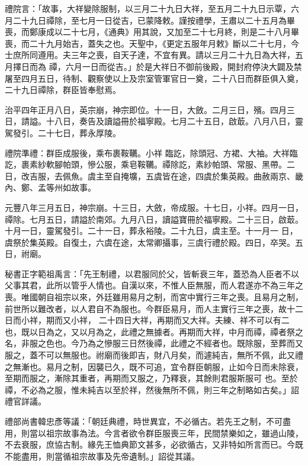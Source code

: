 \begin{pinyinscope}
 禮院言：「故事，大祥變除服制，以三月二十九日大祥，至五月二十九日示覃，六月二十九日禫除，至七月一日從吉，已蒙降敕。謹按禮學，王肅以二十五月為畢喪，而鄭康成以二十七月，《通典》用其說，又加至二十七月終，則是二十八月畢喪，而二十九月始吉，蓋失之也。天聖中，《更定五服年月敕》斷以二十七月，今士庶所同遵用。夫三年之喪，自天子達，不宜有異。請以三月二十九日為大祥，五月擇日而為
 禫，六月一日而從吉。」於是大祥日不御前後殿，開封府停決大闢及禁屠至四月五日，待制、觀察使以上及宗室管軍官日一奠，二十八日而群臣俱入奠，二十九日禫除，群臣皆奉慰焉。



 治平四年正月八日，英宗崩，神宗即位。十一日，大斂。二月三日，殯。四月三日，請謚。十八日，奏告及讀謚冊於福寧殿。七月二十五日，啟菆。八月八日，靈駕發引。二十七日，葬永厚陵。



 禮院準禮：群臣成服後，乘布裹鞍韉。小祥
 臨訖，除頭冠、方裙、大袖。大祥臨訖，裹素紗軟腳帕頭，慘公服，乘皂鞍韉。禫除訖，素紗帕頭、常服、黑帶。二日，改吉服，去佩魚。虞主至自掩壙，五虞皆在途，四虞於集英殿。曲赦兩京、畿內、鄭、孟等州如故事。



 元豐八年三月五日，神宗崩。十三日，大斂，帝成服。十七日，小祥。四月一日，禫除。七月五日，請謚於南郊。九月八日，讀謚寶冊於福寧殿。二十三日，啟菆。十月一日，靈駕發引。二十一日，葬永裕陵。二十九日，虞主至。十一月一
 日，虞祭於集英殿。自復土，六虞在途，太常卿攝事，三虞行禮於殿。四日，卒哭。五日，祔廟。



 秘書正字範祖禹言：「先王制禮，以君服同於父，皆斬衰三年，蓋恐為人臣者不以父事其君，此所以管乎人情也。自漢以來，不惟人臣無服，而人君遂亦不為三年之喪。唯國朝自祖宗以來，外廷雖用易月之制，而宮中實行三年之喪。且易月之制，前世所以難改者，以人君自不為服也。今群臣易月，而人主實行三年之喪，故十二日而小祥，期而又小祥，
 二十四日大祥，再期而又大祥。夫練、祥不可以有二也，既以日為之，又以月為之，此禮之無據者。再期而大祥，中月而禫，禫者祭之名，非服之色也。今乃為之慘服三日然後禫，此禮之不經者也。既除服，至葬而又服之，蓋不可以無服也。祔廟而後即吉，財八月矣，而遽純吉，無所不佩，此又禮之無漸也。易月之制，因襲已久，既不可追，宜令群臣朝服，止如今日而未除衰，至期而服之，漸除其重者，再期而又服之，乃釋衰，其餘則君服斯服可
 也。至於禫，不必為之服，惟未純吉以至於祥，然後無所不佩，則三年之制略如古矣。」詔禮官詳議。



 禮部尚書韓忠彥等議：「朝廷典禮，時世異宜，不必循古。若先王之制，不可盡用，則當以祖宗故事為法。今言者欲令群臣服喪三年，民間禁樂如之，雖過山陵，不去衰服，庶協古制。緣先王恤典節文甚多，必欲循古，又非特如所言而已。今既不能盡用，則當循祖宗故事及先帝遺制。」詔從其議。




\end{pinyinscope}
